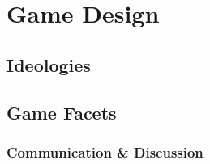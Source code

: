 





\section{Game Design}\label{sec: game design}





\subsection{Ideologies}\label{sec: ideologies}


\subsection{Game Facets}\label{sec: game facets}


\subsubsection{Communication \& Discussion}\label{sec: comms}

